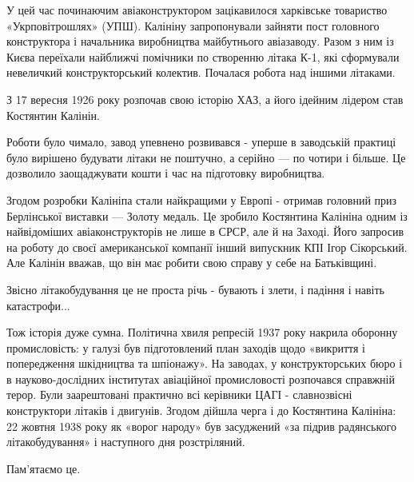 У цей час починаючим авіаконструктором зацікавилося харківське товариство
«Укрповітрошлях» (УПШ). Калініну запропонували зайняти пост головного
конструктора і начальника виробництва майбутнього авіазаводу. Разом з ним із
Києва переїхали найближчі помічники по створенню літака К-1, які сформували
невеличкий конструкторський колектив. Почалася робота над іншими літаками. 

З 17 вересня 1926 року розпочав свою історію ХАЗ, а його ідейним лідером став
Костянтин Калінін. 

Роботи було чимало, завод упевнено розвивався - уперше в заводській практиці
було вирішено будувати літаки не поштучно, а серійно — по чотири і більше. Це
дозволило заощаджувати кошти і час на підготовку виробництва.

Згодом розробки Калініпа стали найкращими у Европі - отримав головний приз
Берлінської виставки — Золоту медаль. Це зробило Костянтина Калініна одним із
найвідоміших авіаконструкторів не лише в СРСР, але й на Заході. Його запросив
на роботу до своєї американської компанії інший випускник КПІ Ігор Сікорський.
Але Калінін вважав, що він має робити свою справу у себе на Батьківщині.

Звісно літакобудування це не проста річь - бувають і злети, і падіння і навіть
катастрофи...

Тож історія дуже сумна.  Політична хвиля репресій 1937 року накрила оборонну
промисловість: у галузі був підготовлений план заходів щодо «викриття і
попередження шкідництва та шпіонажу». На заводах, у конструкторських бюро і в
науково-дослідних інститутах авіаційної промисловості розпочався справжній
терор. Були заарештовані практично всі керівники ЦАГІ - славнозвісні
конструктори літаків і двигунів. Згодом дійшла черга і до Костянтина Калініна:
22 жовтня 1938 року як «ворог народу» був засуджений «за підрив радянського
літакобудування» і наступного дня розстріляний.

Пам'ятаємо це.
